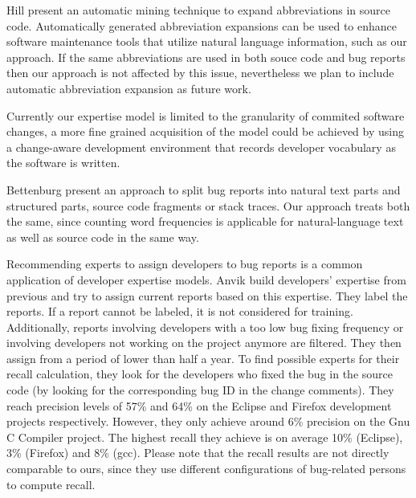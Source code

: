 
Hill \etal \cite{Hill08a} present an automatic mining technique to expand abbreviations in source code.  Automatically generated abbreviation expansions can be used to enhance software maintenance tools that utilize natural language information, such as our approach. If the same abbreviations are used in both souce code and bug reports then our approach is not affected by this issue, nevertheless we plan to include  automatic abbreviation expansion as future work.

Currently our expertise model is limited to the granularity of commited software changes, a more fine grained acquisition of the model could be achieved by using a change-aware development environment \cite{Omor08a,Robb08a} that records developer vocabulary as the software is written.  

Bettenburg \etal \cite{Bett08c} present an approach to split bug reports into natural text parts and structured parts, \ie source code fragments or stack traces. Our approach treats both the same, since counting word frequencies is applicable for natural-language text as well as source code in the same way.

Recommending experts to assign developers to bug reports is a common application of developer expertise models.
Anvik \etal \cite{Anvi06a} build developers' expertise from previous \BRs and try to assign current reports based on this expertise. They label the reports. If a report cannot be labeled, it is not considered for training. Additionally, reports involving developers with a too low bug fixing frequency or involving developers not working on the project anymore are filtered. They then assign \BRs from a period of lower than half a year. To find possible experts for their recall calculation, they look for the developers who fixed the bug in the source code (by looking for the corresponding bug ID in the change comments). They reach precision levels of 57\% and 64\% on the Eclipse and Firefox development projects respectively. However, they only achieve around 6\% precision on the Gnu C Compiler project. The highest recall they achieve is on average 10\% (Eclipse), 3\% (Firefox) and 8\% (gcc). Please note that the recall results are not directly comparable to ours, since they use different configurations of bug-related persons to compute recall.

